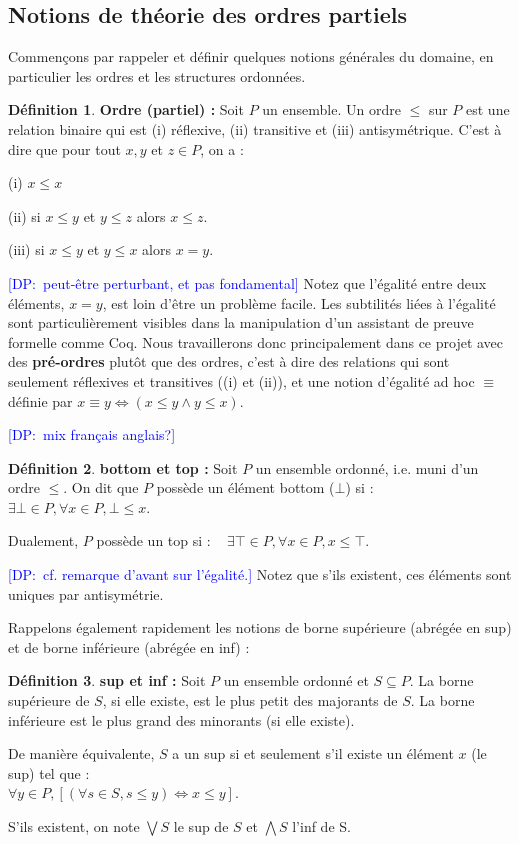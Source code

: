 \documentclass{article}
\newcommand\dam[1]{\textcolor{blue}{{[DP:~#1]}}}
\theoremstyle{definition}
\newtheorem{definition}{Définition}[section]
\begin{document}
\subsection{Notions de théorie des ordres partiels}

Commençons par rappeler et définir quelques notions générales du domaine, en particulier les ordres et les structures ordonnées.

\begin{definition}{\textbf{Ordre (partiel) : }}
Soit $P$ un ensemble. Un ordre $\leq$ sur $P$ est une relation binaire qui est (i) réflexive, (ii) transitive et (iii) antisymétrique. C'est à dire que pour tout $x, y$ et $z \in P$, on a :

(i) $x \leq x$

(ii) si $x \leq y$ et $y \leq z$ alors $x \leq z$.

(iii) si $x \leq y$ et $y \leq x$ alors $x = y$.
\end{definition}

\dam{peut-être perturbant, et pas fondamental}
Notez que l'égalité entre deux éléments, $x = y$, est loin d'être un problème facile. Les subtilités liées à l'égalité sont particulièrement visibles dans la manipulation d'un assistant de preuve formelle comme Coq. Nous travaillerons donc principalement dans ce projet avec des \textbf{pré-ordres} plutôt que des ordres, c'est à dire des relations qui sont seulement réflexives et transitives ((i) et (ii)), et une notion d'égalité ad hoc $\equiv$ définie par $x \equiv y \Longleftrightarrow (x \leq y \wedge y \leq x)$.

\dam{mix français anglais?}
\begin{definition}{\textbf{bottom et top : }}
Soit $P$ un ensemble ordonné, i.e. muni d'un ordre $\leq$. On dit que $P$ possède un élément bottom ($\bot$) si : ~ $\exists \bot \in P, \forall x \in P, \bot \leq x$.

\noindent Dualement, $P$ possède un top si : ~ $\exists \top \in P, \forall x \in P, x \leq \top$.

\dam{cf. remarque d'avant sur l'égalité.}
Notez que s'ils existent, ces éléments sont uniques par antisymétrie.
\end{definition}

Rappelons également rapidement les notions de borne supérieure (abrégée en sup) et de borne inférieure (abrégée en inf) :

\begin{definition}{\textbf{sup et inf : }}
Soit $P$ un ensemble ordonné et $S \subseteq P$. La borne supérieure de $S$, si elle existe, est le plus petit des majorants de $S$. La borne inférieure est le plus grand des minorants (si elle existe).

De manière équivalente, $S$ a un sup si et seulement s'il existe un élément $x$ (le sup) tel que :\\ $\forall y \in P,
[(\forall s \in S, s \leq y) \Longleftrightarrow x \leq y]$.

S'ils existent, on note $\bigvee S$ le sup de $S$ et $\bigwedge S$ l'inf de S.
\end{definition}
\end{document}
